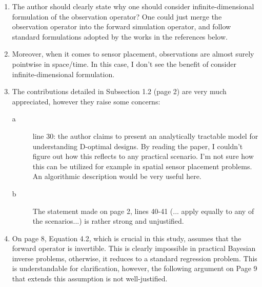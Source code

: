 \documentclass{amsart}
\numberwithin{equation}{section}
\begin{document}
\begin{enumerate} 
  \item The author should clearly state why one should consider
  infinite-dimensional formulation of the observation operator? One
  could just merge the observation operator into the forward simulation
  operator, and follow standard formulations adopted by the works in the
  references below.

  \item Moreover, when it comes to sensor placement, observations are
    almost surely pointwise in space/time. In this case, I don't see
    the benefit of consider infinite-dimensional formulation.

  \item The contributions detailed in Subsection 1.2 (page 2) are very
    much appreciated, however they raise some concerns:
    \begin{description}
      \item [a] line 30: the author claims to present an analytically
        tractable model for understanding D-optimal designs. By
        reading the paper, I couldn't figure out how this reflects to
        any practical scenario. I'm not sure how this can be utilized
        for example in spatial sensor placement problems. An
        algorithmic description would be very useful here.  

      \item [b] The statement made on page 2, lines 40-41 (... apply
        equally to any of the scenarios...) is rather strong and
        unjustified.
    \end{description}

    \item On page 8, Equation 4.2, which is crucial in this study,
      assumes that the forward operator is invertible. This is clearly
      impossible in practical Bayesian inverse problems, otherwise, it
      reduces to a standard regression problem. This is understandable
      for clarification, however, the following argument on Page 9
      that extends this assumption is not well-justified.


\end{enumerate}
\end{document}

